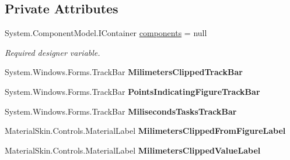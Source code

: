 \subsection*{Private Attributes}
\begin{DoxyCompactItemize}
\item 
System.\+Component\+Model.\+I\+Container \mbox{\hyperlink{class_chess_tracking_1_1_user_interface_1_1_advanced_settings_form_a54c26d0f996bf2fb245dbffcc97f584c}{components}} = null
\begin{DoxyCompactList}\small\item\em Required designer variable. \end{DoxyCompactList}\item 
\mbox{\label{class_chess_tracking_1_1_user_interface_1_1_advanced_settings_form_abee0bf41f7f34f8ac06fd1b5d3b34ba1}} 
System.\+Windows.\+Forms.\+Track\+Bar {\bfseries Milimeters\+Clipped\+Track\+Bar}
\item 
\mbox{\label{class_chess_tracking_1_1_user_interface_1_1_advanced_settings_form_a0c0535ef064d5fb71b5f90f94b76e6b3}} 
System.\+Windows.\+Forms.\+Track\+Bar {\bfseries Points\+Indicating\+Figure\+Track\+Bar}
\item 
\mbox{\label{class_chess_tracking_1_1_user_interface_1_1_advanced_settings_form_ad38f4e99cc5fb6aa57b7860ad4559fba}} 
System.\+Windows.\+Forms.\+Track\+Bar {\bfseries Miliseconds\+Tasks\+Track\+Bar}
\item 
\mbox{\label{class_chess_tracking_1_1_user_interface_1_1_advanced_settings_form_a571ab8288f20f57039e5cfce35492d03}} 
Material\+Skin.\+Controls.\+Material\+Label {\bfseries Milimeters\+Clipped\+From\+Figure\+Label}
\item 
\mbox{\label{class_chess_tracking_1_1_user_interface_1_1_advanced_settings_form_ab3d272ae39e4e9ab65a627b827994800}} 
Material\+Skin.\+Controls.\+Material\+Label {\bfseries Milimeters\+Clipped\+Value\+Label}
\item 
\mbox{\label{class_chess_tracking_1_1_user_interface_1_1_advanced_settings_form_a150cd8b570425bb961bc1a83b81894e7}} 

\end{DoxyCompactItemize}
